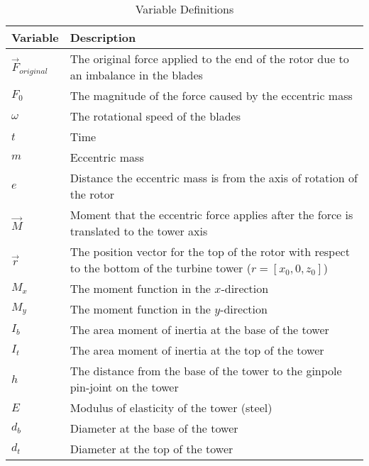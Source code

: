 \begin{table}[] \label{t:variable_definitions}
\caption{Variable Definitions}
\vspace*{0.2in}
\begin{tabular}{|m{1in}|m{4in}|}
\hline
\rowcolor[HTML]{EFEFEF} 
\textbf{Variable} & \textbf{Description} \\ \hline
$\vec{F}_{original}$ & The original force applied to the end of the rotor due to an imbalance in the blades \\ \hline
$F_0$ & The magnitude of the force caused by the eccentric mass \\ \hline
$\omega$ & The rotational speed of the blades \\ \hline
$t$ & Time \\ \hline
$m$ & Eccentric mass \\ \hline
$e$ & Distance the eccentric mass is from the axis of rotation of the rotor \\ \hline
$\vec{M}$ & Moment that the eccentric force applies after the force is translated to the tower axis \\ \hline
$\vec{r}$ & The position vector for the top of the rotor with respect to the bottom of the turbine tower ($r=[x_0, 0, z_0]$) \\ \hline
$M_x$ & The moment function in the $x$-direction \\ \hline
$M_y$ & The moment function in the $y$-direction \\ \hline
$I_b$ & The area moment of inertia at the base of the tower \\ \hline
$I_t$ & The area moment of inertia at the top of the tower \\ \hline
$h$ & The distance from the base of the tower to the ginpole pin-joint on the tower \\ \hline
$E$ & Modulus of elasticity of the tower (steel) \\ \hline
$d_b$ & Diameter at the base of the tower \\ \hline
$d_t$ & Diameter at the top of the tower \\ \hline
\end{tabular}
\end{table}
\FloatBarrier




